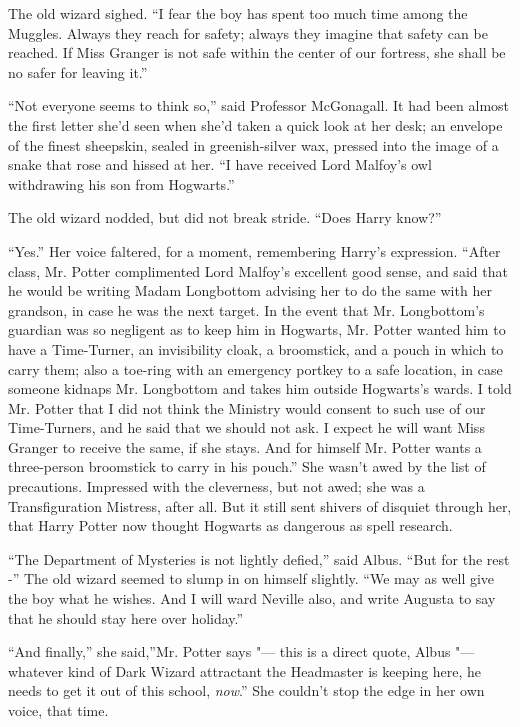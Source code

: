 The old wizard sighed. ``I fear the boy has spent too much time among
the Muggles. Always they reach for safety; always they imagine that
safety can be reached. If Miss Granger is not safe within the center of
our fortress, she shall be no safer for leaving it.''

``Not everyone seems to think so,'' said Professor McGonagall. It had
been almost the first letter she'd seen when she'd taken a quick look at
her desk; an envelope of the finest sheepskin, sealed in greenish-silver
wax, pressed into the image of a snake that rose and hissed at her. ``I
have received Lord Malfoy's owl withdrawing his son from Hogwarts.''

The old wizard nodded, but did not break stride. ``Does Harry know?''

``Yes.'' Her voice faltered, for a moment, remembering Harry's
expression. ``After class, Mr. Potter complimented Lord Malfoy's
excellent good sense, and said that he would be writing Madam Longbottom
advising her to do the same with her grandson, in case he was the next
target. In the event that Mr. Longbottom's guardian was so negligent as
to keep him in Hogwarts, Mr. Potter wanted him to have a Time-Turner, an
invisibility cloak, a broomstick, and a pouch in which to carry them;
also a toe-ring with an emergency portkey to a safe location, in case
someone kidnaps Mr. Longbottom and takes him outside Hogwarts's wards. I
told Mr. Potter that I did not think the Ministry would consent to such
use of our Time-Turners, and he said that we should not ask. I expect he
will want Miss Granger to receive the same, if she stays. And for
himself Mr. Potter wants a three-person broomstick to carry in his
pouch.'' She wasn't awed by the list of precautions. Impressed with the
cleverness, but not awed; she was a Transfiguration Mistress, after all.
But it still sent shivers of disquiet through her, that Harry Potter now
thought Hogwarts as dangerous as spell research.

``The Department of Mysteries is not lightly defied,'' said Albus. ``But
for the rest -'' The old wizard seemed to slump in on himself slightly.
``We may as well give the boy what he wishes. And I will ward Neville
also, and write Augusta to say that he should stay here over holiday.''

``And finally,'' she said,''Mr. Potter says "--- this is a direct quote,
Albus "--- whatever kind of Dark Wizard attractant the Headmaster is
keeping here, he needs to get it out of this school, \emph{now}.'' She
couldn't stop the edge in her own voice, that time.

